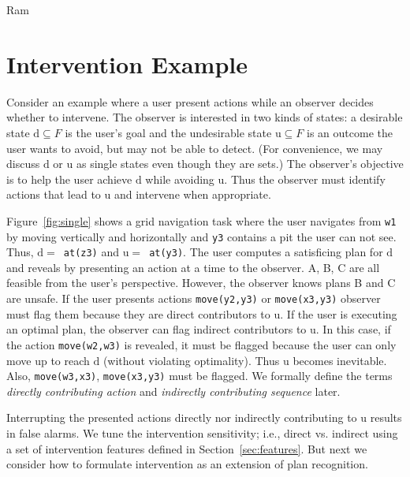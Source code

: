 \documentclass[doctor]{thesis} %
\theoremstyle{plain}
\begin{document}
Ram\section*{Intervention Example}
Consider an example where a user present actions while an observer decides whether to intervene.
The observer is interested in two kinds of states:  a desirable state $\mathrm{d} \subseteq F$ is the user's goal and the undesirable state $\mathrm{u} \subseteq F$  is an outcome the user wants to avoid, but may not be able to detect.
(For convenience, we may discuss $\mathrm{d}$ or $\mathrm{u}$ as single states even though they are sets.)
The observer's objective is to help the user achieve $\mathrm{d}$ while avoiding $\mathrm{u}$.
Thus the observer must identify actions that lead to $\mathrm{u}$ and intervene when appropriate.

Figure~\ref{fig:single} shows a grid navigation task where the user navigates from \texttt{w1} by moving vertically and horizontally and \texttt{y3} contains a pit the user can not see.
Thus, \mbox{$\mathrm{d}=$ \texttt{at(z3)}} and \mbox{$\mathrm{u}=$ \texttt{at(y3)}}. The user computes a satisficing plan for $\mathrm{d}$ and reveals by presenting an action at a time to the observer. A, B, C are all feasible from the user's perspective.
However, the observer knows plans B and C are unsafe.
If the user presents actions \texttt{move(y2,y3)} or \texttt{move(x3,y3)} observer must flag them because they are direct contributors to $\mathrm{u}$.
If the user is executing an optimal plan, the observer can flag indirect contributors to $\mathrm{u}$. In this case, if the action \texttt{move(w2,w3)} is revealed, it must be flagged because the user can only move up to reach $\mathrm{d}$ (without violating optimality). Thus $\mathrm{u}$ becomes inevitable. Also, \texttt{move(w3,x3)}, \texttt{move(x3,y3)} must be flagged. We formally define the terms \textit{directly contributing action} and \textit{indirectly contributing sequence} later.

Interrupting the presented actions directly nor indirectly contributing to $\mathrm{u}$ results in false alarms.
We tune the intervention sensitivity; i.e., direct vs. indirect using a set of intervention features defined in Section~\ref{sec:features}.
But next we consider how to formulate intervention as an extension of plan recognition.
\end{document}

